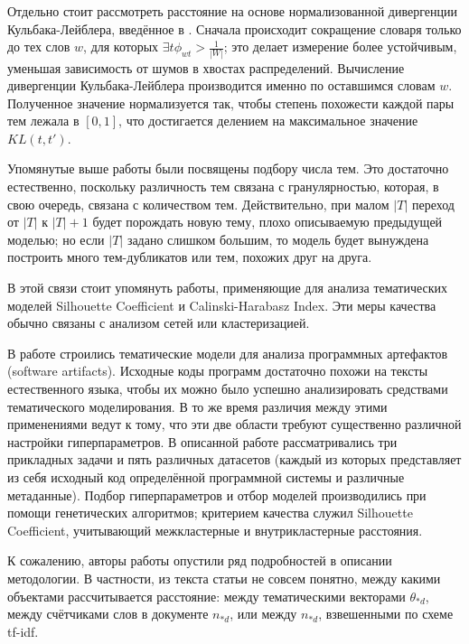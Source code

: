 Отдельно стоит рассмотреть расстояние на основе нормализованной дивергенции Кульбака-Лейблера, введённое в \cite{koltcov2014latent}. Сначала происходит сокращение словаря только до тех слов $w$, для которых $\exists t \phi_{wt} > \frac{1}{|W|}$; это делает измерение более устойчивым, уменьшая зависимость от шумов в хвостах распределений. Вычисление дивергенции Кульбака-Лейблера производится именно по оставшимся словам $w$. Полученное значение нормализуется так, чтобы степень похожести каждой пары тем лежала в $[0, 1]$, что достигается делением на максимальное значение $KL(t, t')$.

Упомянутые выше работы были посвящены подбору числа тем. Это достаточно естественно, поскольку различность тем связана с гранулярностью, которая, в свою очередь, связана с количеством тем. Действительно, при малом $|T|$ переход от $|T|$ к $|T|+1$ будет порождать новую тему, плохо описываемую предыдущей моделью; но если $|T|$ задано слишком большим, то модель будет вынуждена построить много тем-дубликатов или тем, похожих друг на друга.

В этой связи стоит упомянуть работы, применяющие для анализа тематических моделей Silhouette Coefficient и Calinski-Harabasz Index. Эти меры качества обычно связаны с анализом сетей или кластеризацией.

В работе \cite{panichella2013effectively} строились тематические модели для анализа программных артефактов (software artifacts). Исходные коды программ достаточно похожи на тексты естественного языка, чтобы их можно было успешно анализировать средствами тематического моделирования. В то же время различия между этими применениями ведут к тому, что эти две области требуют существенно различной настройки гиперпараметров. В описанной работе рассматривались три прикладных задачи и пять различных датасетов (каждый из которых представляет из себя исходный код определённой программной системы и различные метаданные). Подбор гиперпараметров и отбор моделей производились при помощи генетических алгоритмов; критерием качества служил Silhouette Coefficient, учитывающий межкластерные и внутрикластерные расстояния.

К сожалению, авторы работы \cite{panichella2013effectively} опустили ряд подробностей в описании методологии. В частности, из текста статьи не совсем понятно, между какими объектами рассчитывается расстояние: между тематическими векторами $\theta_{\ast d}$, между счётчиками слов в документе $n_{\ast d}$, или между $n_{\ast d}$, взвешенными по схеме tf-idf.

